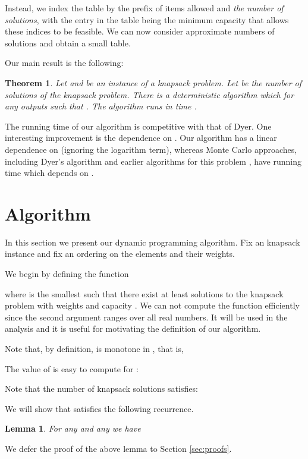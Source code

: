 \documentclass[11pt]{article}
\newtheorem{theorem}{Theorem}[section]
\newtheorem{lemma}{Lemma}[section]
\begin{document}
Instead, we index the table by the prefix of items
allowed and {\em the number of solutions}, with the entry in the
table being the minimum capacity that allows these indices to be
feasible. We can now consider approximate numbers of solutions and
obtain a small table.

Our main result is the following:

\begin{theorem}\label{thm:main}
Let  and  be an instance of a knapsack problem. Let  be the number
of solutions of the knapsack problem. There is a deterministic algorithm which
for any  outputs  such that .
The algorithm runs in time .
\end{theorem}

The running time of our algorithm is competitive with that of
Dyer. One interesting improvement is the dependence on .
Our algorithm has a linear dependence on  (ignoring
the logarithm term), whereas Monte Carlo approaches, including
Dyer's algorithm \cite{Dyer} and earlier algorithms for this
problem \cite{MorrisSinclair,DFKKPV}, have running time which
depends on .

\section{Algorithm}
\label{sec:algorithm}

In this section we present our dynamic programming algorithm.
Fix an knapsack instance and fix an ordering on the elements and their weights.

We begin by defining the function

where  is the smallest
 such that there exist at least  solutions to the knapsack problem with weights
 and capacity .
We can not compute the function  efficiently since the second argument
ranges over all real numbers.  It will be used in the analysis and it is useful
for motivating the definition of our algorithm.

Note that, by definition,  is monotone in
, that is,

The value of  is easy to compute for :

Note that the number of knapsack solutions satisfies:


We will show that  satisfies the following recurrence.
\begin{lemma}
\label{lem:recur}
For any  and any  we have

\end{lemma}

We defer the proof of the above lemma to Section \ref{sec:proofs}.
\end{document}
